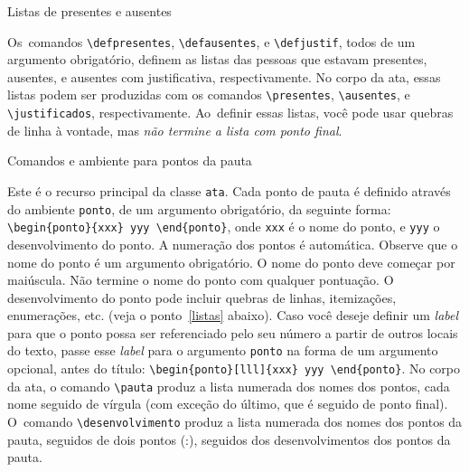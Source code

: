 \documentclass[12pt,a4paper,euler,beton]{ata}
\begin{document}
\begin{ponto}{Listas de presentes e ausentes}

  Os~comandos \verb+\defpresentes+, \verb+\defausentes+, e
  \verb+\defjustif+, todos de um argumento obrigatório, definem as
  listas das pessoas que estavam presentes, ausentes, e ausentes com
  justificativa, respectivamente. No corpo da ata, essas listas podem
  ser produzidas com os comandos \verb+\presentes+, \verb+\ausentes+,
  e \verb+\justificados+, respectivamente. Ao~definir essas listas,
  você pode usar quebras de linha à vontade, mas \emph{não termine a
    lista com ponto final}.

\end{ponto}


\begin{ponto}{Comandos e ambiente para pontos da pauta}

  Este é o recurso principal da classe \texttt{ata}. Cada ponto de
  pauta é definido através do ambiente \texttt{ponto}, de um argumento
  obrigatório, da seguinte forma:
  \verb+\begin{ponto}{xxx} yyy \end{ponto}+, onde \verb+xxx+ é o nome
  do ponto, e \verb+yyy+ o desenvolvimento do ponto. A numeração dos
  pontos é automática. Observe que o nome do ponto é um argumento
  obrigatório. O nome do ponto deve começar por maiúscula. Não termine
  o nome do ponto com qualquer pontuação. O desenvolvimento do ponto pode
  incluir quebras de linhas, itemizações, enumerações, etc. (veja o
  ponto~\ref{listas} abaixo). Caso você deseje definir um \emph{label}
  para que o ponto possa ser referenciado pelo seu número a partir de
  outros locais do texto, passe esse \emph{label} para o argumento
  \texttt{ponto} na forma de um argumento opcional, antes do título:
  \verb+\begin{ponto}[lll]{xxx} yyy \end{ponto}+. No corpo da ata, o
  comando \verb+\pauta+ produz a lista numerada dos nomes dos pontos,
  cada nome seguido de vírgula (com exceção do último, que é seguido
  de ponto final). O~comando \verb+\desenvolvimento+ produz a lista
  numerada dos nomes dos pontos da pauta, seguidos de dois pontos (:),
  seguidos dos desenvolvimentos dos pontos da pauta.

\end{ponto}
\end{document}
